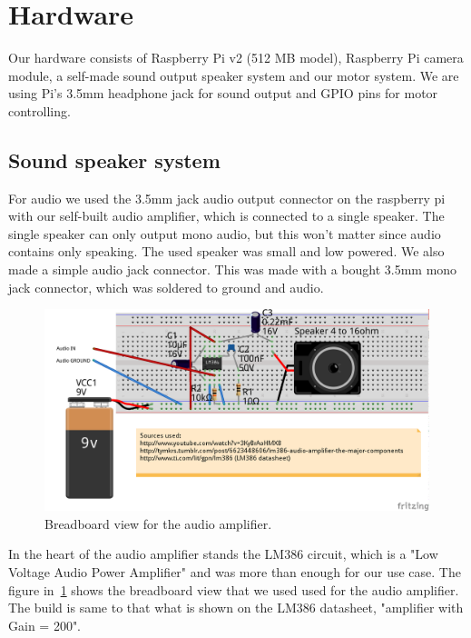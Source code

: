 \documentclass[english,11pt,twoside,a4paper]{article}
\begin{document}
\section{Hardware}

Our hardware consists of Raspberry Pi v2 (512 MB model), Raspberry Pi camera module, a self-made sound output speaker system and our motor system. We are using Pi's 3.5mm headphone jack for sound output and GPIO pins for motor controlling.

\subsection{Sound speaker system}

For audio we used the 3.5mm jack audio output connector on the raspberry pi with our self-built audio amplifier, which is connected to a single speaker. The single speaker can only output mono audio, but this won't matter since audio contains only speaking. The used speaker was small and low powered. We also made a simple audio jack connector. This was made with a bought 3.5mm mono jack connector, which was soldered to ground and audio.

\begin{figure}
  \begin{center}
    \includegraphics[scale=0.75]{audio_amplifier_lm386_bb.png}
    \caption{Breadboard view for the audio amplifier.}
  \end{center}
  \label{lm386_bb}
\end{figure}

In the heart of the audio amplifier stands the LM386 circuit, which is a "Low Voltage Audio Power Amplifier" and was more than enough for our use case. The figure in~\ref{lm386_bb} shows the breadboard view that we used used for the audio amplifier. The build is same to that what is shown on the LM386 datasheet, "amplifier with Gain = 200".
\end{document}

